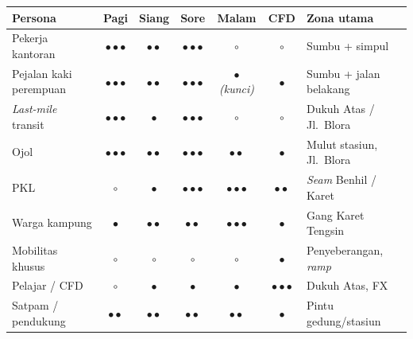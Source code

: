 \documentclass[11pt,a4paper]{report}
\begin{document}
\begin{longtable}{@{}p{3.2cm}ccccc p{2.6cm}@{}}
\toprule
\textbf{Persona} & \textbf{Pagi} & \textbf{Siang} & \textbf{Sore} & \textbf{Malam} & \textbf{CFD} & \textbf{Zona utama} \\
\midrule
\endhead
Pekerja kantoran & $\bullet\bullet\bullet$ & $\bullet\bullet$ & $\bullet\bullet\bullet$ & $\circ$ & $\circ$ & Sumbu + simpul \\
Pejalan kaki perempuan & $\bullet\bullet\bullet$ & $\bullet\bullet$ & $\bullet\bullet\bullet$ & $\bullet$ \emph{(kunci)} & $\bullet$ & Sumbu + jalan belakang \\
\emph{Last-mile} transit & $\bullet\bullet\bullet$ & $\bullet$ & $\bullet\bullet\bullet$ & $\circ$ & $\circ$ & Dukuh Atas / Jl.\ Blora \\
Ojol & $\bullet\bullet\bullet$ & $\bullet\bullet$ & $\bullet\bullet\bullet$ & $\bullet\bullet$ & $\bullet$ & Mulut stasiun, Jl.\ Blora \\
PKL & $\circ$ & $\bullet$ & $\bullet\bullet\bullet$ & $\bullet\bullet\bullet$ & $\bullet\bullet$ & \emph{Seam} Benhil / Karet \\
Warga kampung & $\bullet$ & $\bullet\bullet$ & $\bullet\bullet$ & $\bullet\bullet\bullet$ & $\bullet$ & Gang Karet Tengsin \\
Mobilitas khusus & $\circ$ & $\circ$ & $\circ$ & $\circ$ & $\bullet$ & Penyeberangan, \emph{ramp} \\
Pelajar / CFD & $\circ$ & $\bullet$ & $\bullet$ & $\bullet$ & $\bullet\bullet\bullet$ & Dukuh Atas, FX \\
Satpam / pendukung & $\bullet\bullet$ & $\bullet\bullet$ & $\bullet\bullet$ & $\bullet\bullet$ & $\bullet$ & Pintu gedung/stasiun \\
\bottomrule
\end{longtable}
\end{document}
